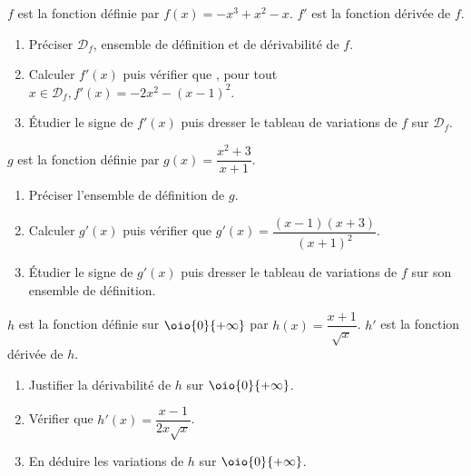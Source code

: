 \documentclass[a4paper,11pt,exos]{nsi} %
\begin{document}
\exo{}
$f$ est la fonction définie par $f(x)=-x^3+x^2-x$. $f'$ est la fonction dérivée de $f$.
\begin{enumerate}
	\item 	Préciser $\mathcal{D}_f$, ensemble de définition et de dérivabilité de $f$.
	\item 	Calculer $f'(x)$ puis vérifier que , pour tout $x\in \mathcal{D}_f, f'(x)=-2x^2-(x-1)^2$.
	\item	\'Etudier le signe de $f'(x)$ puis dresser le tableau de variations de $f$ sur $\mathcal{D}_f$.	
\end{enumerate}


\exo{}
$g$ est la fonction définie par $g(x)=\dfrac{x^2+3}{x+1}$.
\begin{enumerate}
	\item 	Préciser l'ensemble de définition de $g$.
	\item 	Calculer $g'(x)$ puis vérifier que $g'(x)=\dfrac{(x-1)(x+3)}{(x+1)^2}$.
	\item	\'Etudier le signe de $g'(x)$ puis dresser le tableau de variations de $f$ sur son ensemble de définition.	
\end{enumerate}


\exo{}
$h$ est la fonction définie sur $\oio{0}{+\infty}$ par $h(x)=\dfrac{x+1}{\sqrt{x}}$. $h'$ est la fonction dérivée de $h$.
\begin{enumerate}
	\item 	Justifier la dérivabilité de $h$ sur $\oio{0}{+\infty}$.
	\item 	Vérifier que $h'(x)=\dfrac{x-1}{2x\sqrt{x}}$.
	\item	En déduire les variations de $h$ sur $\oio{0}{+\infty}$.
\end{enumerate}
\end{document}
